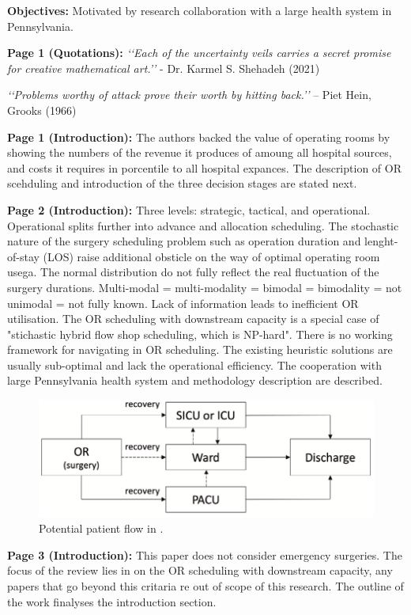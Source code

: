     \textbf{Objectives:}
    Motivated by research collaboration with a large health system in Pennsylvania.
    
    \textbf{Page 1 (Quotations):}
    \textit{‘‘Each of the uncertainty veils carries a secret promise for creative mathematical art.’’} - Dr. Karmel S. Shehadeh (2021)
    
    \textit{‘‘Problems worthy of attack prove their worth by hitting back.’’} – Piet Hein, Grooks (1966)

    \textbf{Page 1 (Introduction):}
    The authors backed the value of operating rooms by showing the numbers of the revenue it produces of amoung all hospital sources, and costs it requires in porcentile to all hospital expances. The description of OR scehduling and introduction of the three decision stages are stated next.
    
    \textbf{Page 2 (Introduction):}
    Three levels: strategic, tactical, and operational. Operational splits further into advance and allocation scheduling. The stochastic nature of the surgery scheduling problem such as operation duration and lenght-of-stay (LOS) raise additional obsticle on the way of optimal operating room usega. The normal distribution do not fully reflect the real fluctuation of the surgery durations. Multi-modal = multi-modality = bimodal = bimodality = not unimodal = not fully known. Lack of information leads to inefficient OR utilisation. The OR scheduling with downstream capacity is a special case of "stichastic hybrid flow shop scheduling, which is NP-hard". There is no working framework for navigating in OR scheduling. The existing heuristic solutions are usually sub-optimal and lack the operational efficiency. The cooperation with large Pennsylvania health system and methodology description are described. 
    \begin{figure}[H]
        \centering
        \includegraphics[width=.7\textwidth]{figures/0015_SR04US22/fig1.png}
        \caption{Potential patient flow in \cite{x335}.}
        \label{fig1:0015_SR04US22}
    \end{figure}
    
    \textbf{Page 3 (Introduction):}
    This paper does not consider emergency surgeries. The focus of the review lies in on the OR scheduling with downstream capacity, any papers that go beyond this critaria re out of scope of this research. The outline of the work finalyses the introduction section.

